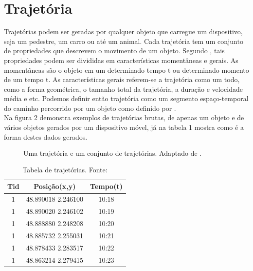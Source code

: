 \documentclass[	12pt, Times, openright, twoside, a4paper, english, brazil]{abntex2}
\begin{document}
\section{Trajetória}
Trajetórias podem ser geradas por qualquer objeto que carregue um dispositivo, seja um pedestre, um carro ou até um animal. Cada trajetória tem um conjunto de propriedades que descrevem o movimento de um objeto. Segundo \cite{Giannotti2008}, tais propriedades podem ser divididas em características momentâneas e gerais. As momentâneas são o objeto em um determinado tempo t ou determinado momento de um tempo t. As características gerais referem-se a trajetória como um todo, como a forma geométrica, o tamanho total da trajetória, a duração e velocidade média e etc. Podemos definir então trajetória como um segmento espaço-temporal do caminho percorrido por um objeto como definido por \cite{Spaccapietra2008}.\\
\indent Na figura 2 demonstra exemplos de trajetórias brutas, de apenas um objeto e de vários objetos gerados por um dispositivo móvel, já na tabela 1 mostra como é a forma destes dados gerados.
\begin{figure}[!ht]
\caption{Uma trajetória e um conjunto de trajetórias. Adaptado de \cite{Giannotti2008}.\label{fig:trajetorias}}
\end{figure}

\begin{table}[!ht]
	\centering
		\caption{Tabela de trajetórias. Fonte:\cite{Bogorny2012}}	\label{tab:exemplo}
		\begin{tabular}{|c|c|c|}
			\hline  \textbf{Tid} &	\textbf{Posição(x,y)} &	\textbf{Tempo(t)} \\
			\hline 1 & 48.890018	2.246100	& 10:18	\\
			\hline 1 & 48.890020	2.246102	& 10:19	\\
			\hline 1 & 48.888880	2.248208	& 10:20	\\
			\hline 1 & 48.885732	2.255031	& 10:21	\\
			\hline 1 & 48.878433	2.283517	& 10:22	\\
            \hline 1 & 48.863214	2.279415	& 10:23	\\
			\hline 
		\end{tabular}
\end{table}
\end{document}
